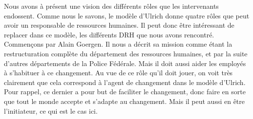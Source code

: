 
Nous avons à présent une vision des différents rôles que les intervenants endossent. Comme nous le savons, le modèle d'Ulrich donne quatre rôles que peut avoir un responsable de ressources humaines. Il peut donc être intéressant de replacer dans ce modèle, les différents DRH que nous avons rencontré. \\

Commençons par Alain Goergen. Il nous a décrit sa mission comme étant la restructuration complète du département des ressources humaines, et par la suite d'autres départements de la Police Fédérale. Mais il doit aussi aider les employés à s'habituer à ce changement. Au vue de ce rôle qu'il doit jouer, on voit très clairement que cela correspond à l'\og agent de changement \fg{} dans le modèle d'Ulrich. Pour rappel, ce dernier a pour but de faciliter le changement, donc faire en sorte que tout le monde accepte et s'adapte au changement. Mais il peut aussi en être l'initiateur, ce qui est le cas ici. 




